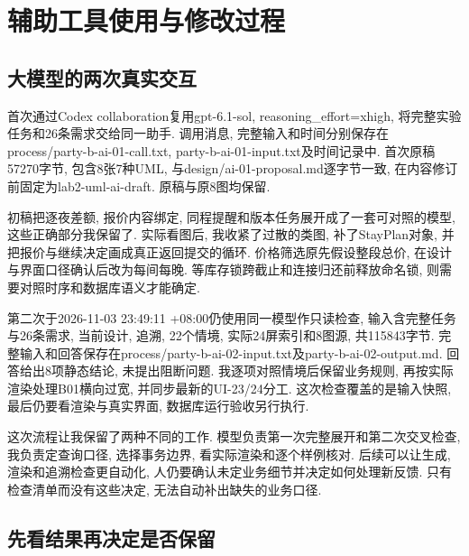 \documentclass[cn,nofont,11pt,a4paper]{elegantpaper}
\begin{document}
\hypertarget{ux8f85ux52a9ux5de5ux5177ux4f7fux7528ux4e0eux4feeux6539ux8fc7ux7a0b}{%
\section{辅助工具使用与修改过程}\label{ux8f85ux52a9ux5de5ux5177ux4f7fux7528ux4e0eux4feeux6539ux8fc7ux7a0b}}

\hypertarget{ux5927ux6a21ux578bux7684ux4e24ux6b21ux771fux5b9eux4ea4ux4e92}{%
\subsection{大模型的两次真实交互}\label{ux5927ux6a21ux578bux7684ux4e24ux6b21ux771fux5b9eux4ea4ux4e92}}

首次通过Codex collaboration复用gpt-6.1-sol, reasoning\_\allowbreak{}effort=xhigh, 将完整实验任务和26条需求交给同一助手. 调用消息, 完整输入和时间分别保存在process/party-b-ai-01-call.txt, party-b-ai-01-input.txt及时间记录中. 首次原稿57270字节, 包含8张7种UML, 与design/ai-01-proposal.md逐字节一致, 在内容修订前固定为lab2-uml-ai-draft. 原稿与原8图均保留.

初稿把逐夜差额, 报价内容绑定, 同程提醒和版本任务展开成了一套可对照的模型, 这些正确部分我保留了. 实际看图后, 我收紧了过散的类图, 补了StayPlan对象, 并把报价与继续决定画成真正返回提交的循环. 价格筛选原先假设整段总价, 在设计与界面口径确认后改为每间每晚. 等库存锁跨截止和连接归还前释放命名锁, 则需要对照时序和数据库语义才能确定.

第二次于2026-11-03 23:49:11 +08:00仍使用同一模型作只读检查, 输入含完整任务与26条需求, 当前设计, 追溯, 22个情境, 实际24屏索引和8图源, 共115843字节. 完整输入和回答保存在process/party-b-ai-02-input.txt及party-b-ai-02-output.md. 回答给出8项静态结论, 未提出阻断问题. 我逐项对照情境后保留业务规则, 再按实际渲染处理B01横向过宽, 并同步最新的UI-23/24分工. 这次检查覆盖的是输入快照, 最后仍要看渲染与真实界面, 数据库运行验收另行执行.

这次流程让我保留了两种不同的工作. 模型负责第一次完整展开和第二次交叉检查, 我负责定查询口径, 选择事务边界, 看实际渲染和逐个样例核对. 后续可以让生成, 渲染和追溯检查更自动化, 人仍要确认未定业务细节并决定如何处理新反馈. 只有检查清单而没有这些决定, 无法自动补出缺失的业务口径.

\hypertarget{ux5148ux770bux7ed3ux679cux518dux51b3ux5b9aux662fux5426ux4fddux7559}{%
\subsection{先看结果再决定是否保留}\label{ux5148ux770bux7ed3ux679cux518dux51b3ux5b9aux662fux5426ux4fddux7559}}
\end{document}
